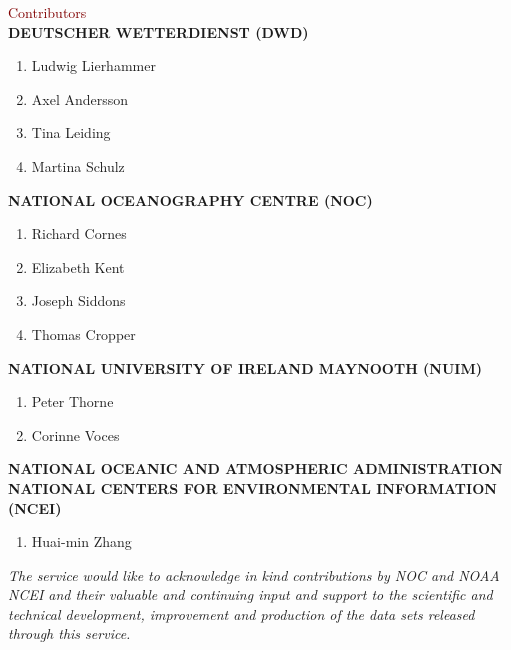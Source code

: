 \newpage

\begin{adjustwidth}{2.cm}{}
\vspace* {10mm}

{\fontsize{20}{24} \selectfont \textcolor{maroon}{Contributors}}\\

{\fontsize{14}{17} \selectfont \textbf{\uppercase{Deutscher Wetterdienst (DWD)}}}
\begin{enumerate}
\item Ludwig Lierhammer
\item Axel Andersson
\item Tina Leiding
\item Martina Schulz
\end{enumerate}

{\fontsize{14}{17} \selectfont \textbf{\uppercase{{National Oceanography Centre (NOC)}}}}
\begin{enumerate}
	\item Richard Cornes
	\item Elizabeth Kent
	\item Joseph Siddons
	\item Thomas Cropper
\end{enumerate}

{\fontsize{14}{17} \selectfont \textbf{\uppercase{National University of Ireland Maynooth (NUIM)}}}
\begin{enumerate}
\item Peter Thorne
\item Corinne Voces
\end{enumerate}

{\fontsize{14}{17} \selectfont \textbf{\uppercase{National Oceanic and Atmospheric Administration National Centers for Environmental Information (NCEI)}}}
\begin{enumerate}
\item Huai-min Zhang
\end{enumerate}

\vspace* {20mm}

\textit{The service would like to acknowledge in kind contributions by NOC and NOAA NCEI and their valuable and continuing input and support to the scientific and technical development, improvement and production of the data sets released through this service.}

\end{adjustwidth}
